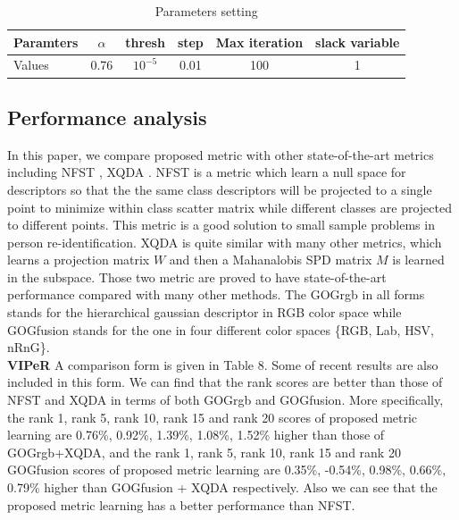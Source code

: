 \documentclass[conference,compsoc]{IEEEtran}
\begin{document}
\begin{table}[H]
\caption{Parameters setting}
\begin{tabular}{|l|c|c|c|c|c|}
\hline
Paramters &$\alpha$&thresh&step&Max iteration& slack variable\\
\hline
Values &0.76&$10^{-5}$&0.01&100&1\\
\hline
\end{tabular}
\end{table}


\subsection{Performance analysis}
In this paper, we compare proposed metric with other state-of-the-art metrics including NFST \cite{NFST}, XQDA \cite{LOMO}. NFST is a metric which learn a null space for descriptors so that the the same class descriptors will be projected to  
a single point to minimize within class scatter matrix while different classes are projected to different points. This metric is a good solution to small sample problems in person re-identification. XQDA is quite similar with many other metrics, which learns a projection matrix $W$ and then a Mahanalobis SPD matrix $M$ is learned in the subspace. Those two metric are proved to have state-of-the-art performance compared with many other methods. The GOGrgb in all forms stands for the hierarchical gaussian descriptor in RGB color space while GOGfusion stands for the one in four different color spaces \{RGB, Lab, HSV, nRnG\}.\\
\textbf{VIPeR} A comparison form is given in Table 8. Some of recent results are also included in this form. We can find that the rank scores are better than those of NFST and XQDA in terms of both GOGrgb and GOGfusion. More specifically, the rank 1, rank 5, rank 10, rank 15 and rank 20 scores of proposed metric learning are 0.76\%, 0.92\%, 1.39\%, 1.08\%, 1.52\% higher than those of GOGrgb+XQDA, and the rank 1, rank 5, rank 10, rank 15 and rank 20 GOGfusion scores of proposed metric learning are 0.35\%, -0.54\%, 0.98\%, 0.66\%, 0.79\% higher than GOGfusion + XQDA respectively. Also we can see that the proposed metric learning has a better performance than NFST. \newline 
\end{document}
